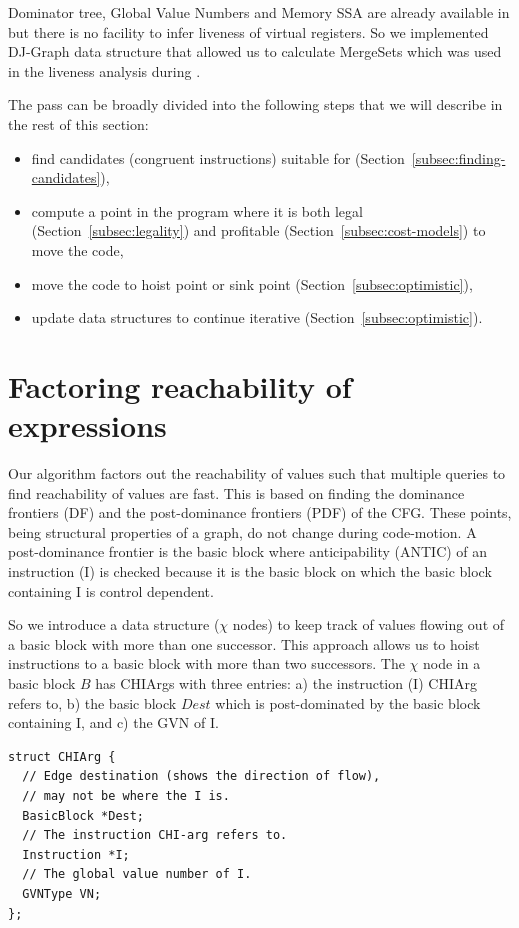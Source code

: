 \documentclass[sigplan,10pt,review,anonymous]{acmart}\settopmatter{printfolios=true,printccs=false,printacmref=false}
\begin{document}
Dominator tree, Global Value Numbers and Memory SSA are already available in
\LLVM{} but there is no facility to infer liveness of virtual registers. So we
implemented DJ-Graph data structure that allowed us to calculate MergeSets which
was used in the liveness analysis during \GCM{}.

The \GCM{} pass can be broadly divided into the following steps that we will
describe in the rest of this section:
\begin{itemize}[leftmargin=*,topsep=0pt]
\item find candidates (congruent instructions) suitable for \gcm{}
  (Section~\ref{subsec:finding-candidates}),
\item compute a point in the program where it is both legal
  (Section~\ref{subsec:legality}) and profitable
  (Section~\ref{subsec:cost-models}) to move the code,
\item move the code to hoist point or sink point
  (Section~\ref{subsec:optimistic}),
\item update data structures to continue iterative \gcm{} (Section~\ref{subsec:optimistic}).
\end{itemize}

\section{Factoring reachability of expressions}
Our algorithm factors out the reachability of values such that multiple queries
to find reachability of values are fast. This is based on finding the dominance
frontiers (DF) and the post-dominance frontiers (PDF) of the CFG. These points,
being structural properties of a graph, do not change during code-motion. A
post-dominance frontier is the basic block where anticipability (ANTIC) of an
instruction (I) is checked because it is the basic block on which the basic
block containing I is control dependent.

So we introduce a data structure ($\chi$ nodes) to keep track of values flowing
out of a basic block with more than one successor. This approach allows us to
hoist instructions to a basic block with more than two successors. The $\chi$
node in a basic block $B$ has CHIArgs with three entries: a) the instruction (I)
CHIArg refers to, b) the basic block $Dest$ which is post-dominated by the basic
block containing I, and c) the GVN of I.

\begin{lstlisting}
struct CHIArg {
  // Edge destination (shows the direction of flow),
  // may not be where the I is.
  BasicBlock *Dest;
  // The instruction CHI-arg refers to.
  Instruction *I;
  // The global value number of I.
  GVNType VN;
};
\end{lstlisting}
\end{document}
